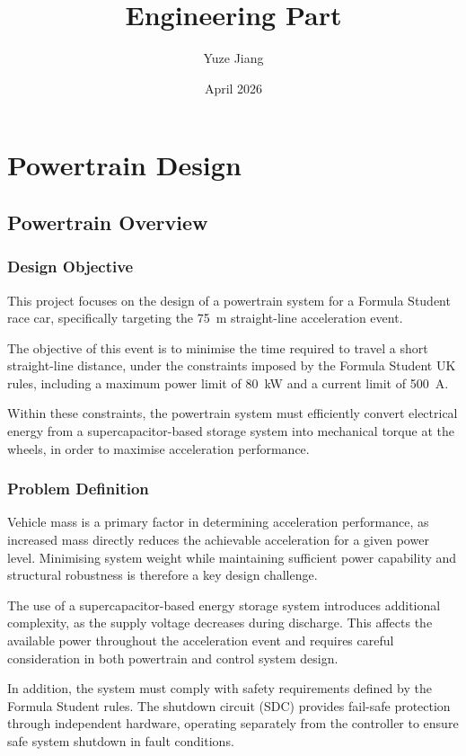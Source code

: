 \documentclass[a4paper,12pt]{article}
\title{Engineering Part}
\author{Yuze Jiang}
\date{April 2026}
\begin{document}
\maketitle

\section{Powertrain Design}

\subsection{Powertrain Overview}

\subsubsection{Design Objective}

This project focuses on the design of a powertrain system for a Formula Student race car, specifically targeting the \SI{75}{\meter} straight-line acceleration event.

The objective of this event is to minimise the time required to travel a short straight-line distance, under the constraints imposed by the Formula Student UK rules, including a maximum power limit of \SI{80}{\kilo\watt} and a current limit of \SI{500}{\ampere}.

Within these constraints, the powertrain system must efficiently convert electrical energy from a supercapacitor-based storage system into mechanical torque at the wheels, in order to maximise acceleration performance.

\subsubsection{Problem Definition}

Vehicle mass is a primary factor in determining acceleration performance, as increased mass directly reduces the achievable acceleration for a given power level. Minimising system weight while maintaining sufficient power capability and structural robustness is therefore a key design challenge.

The use of a supercapacitor-based energy storage system introduces additional complexity, as the supply voltage decreases during discharge. This affects the available power throughout the acceleration event and requires careful consideration in both powertrain and control system design.

In addition, the system must comply with safety requirements defined by the Formula Student rules. The shutdown circuit (SDC) provides fail-safe protection through independent hardware, operating separately from the controller to ensure safe system shutdown in fault conditions.
\end{document}
